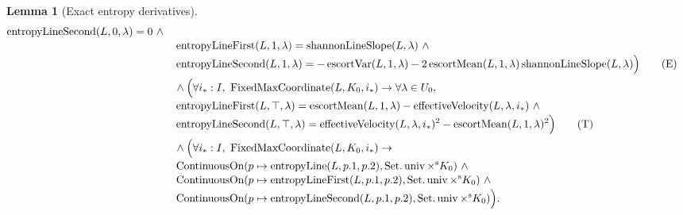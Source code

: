 \documentclass[9pt]{extarticle}
\newtheorem{lemma}{Lemma}[section]
\theoremstyle{definition}
\theoremstyle{remark}
\begin{document}
\begin{lemma}[Exact entropy derivatives]
\begin{align*}
  \operatorname{entropyLineSecond}(L,0,\lambda)=0\ \wedge\\[-2pt]
 &\quad
  \operatorname{entropyLineFirst}(L,1,\lambda)
   =\operatorname{shannonLineSlope}(L,\lambda)\ \wedge\\[-2pt]
 &\quad
  \operatorname{entropyLineSecond}(L,1,\lambda)
   =-\operatorname{escortVar}(L,1,\lambda)
    -2\operatorname{escortMean}(L,1,\lambda)
       \operatorname{shannonLineSlope}(L,\lambda)
 \Bigr)\tag{E}\label{eq:H-endpoint-derivatives}\\
 &\quad\wedge\Bigl(\forall i_*:I,\
   \operatorname{FixedMaxCoordinate}(L,K_0,i_*)\to
   \forall\lambda\in U_0,\\[-2pt]
 &\quad
  \operatorname{entropyLineFirst}(L,\top,\lambda)
   =\operatorname{escortMean}(L,1,\lambda)
    -\operatorname{effectiveVelocity}(L,\lambda,i_*)\ \wedge\\[-2pt]
 &\quad
  \operatorname{entropyLineSecond}(L,\top,\lambda)
   =\operatorname{effectiveVelocity}(L,\lambda,i_*)^2
    -\operatorname{escortMean}(L,1,\lambda)^2
 \Bigr)\tag{T}\label{eq:H-infty-derivatives}\\
 &\quad\wedge\Bigl(\forall i_*:I,\
   \operatorname{FixedMaxCoordinate}(L,K_0,i_*)\to\\[-2pt]
 &\quad
  \operatorname{ContinuousOn}
   (p\mapsto\operatorname{entropyLine}(L,p.1,p.2),
    \operatorname{Set.univ}\times^{\mathrm s}K_0)\ \wedge\\[-2pt]
 &\quad
  \operatorname{ContinuousOn}
   (p\mapsto\operatorname{entropyLineFirst}(L,p.1,p.2),
    \operatorname{Set.univ}\times^{\mathrm s}K_0)\ \wedge\\[-2pt]
 &\quad
  \operatorname{ContinuousOn}
   (p\mapsto\operatorname{entropyLineSecond}(L,p.1,p.2),
    \operatorname{Set.univ}\times^{\mathrm s}K_0)
 \Bigr).
\end{align*}
\end{lemma}
\end{document}

